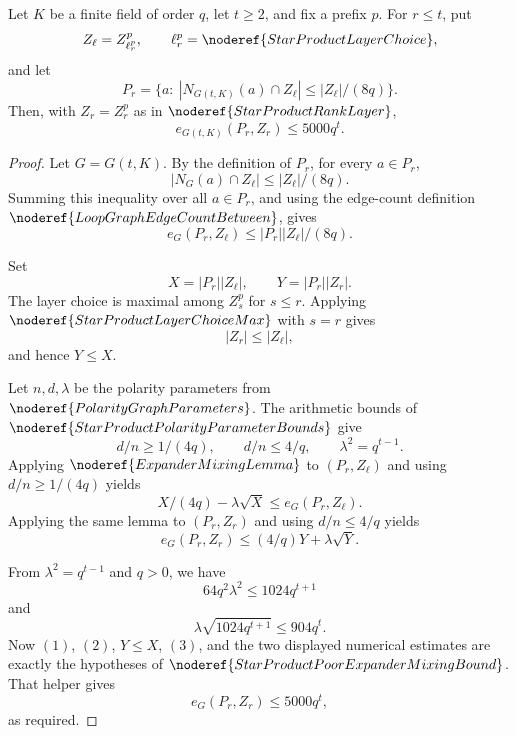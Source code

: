\begin{helper}
Let \(K\) be a finite field of order \(q\), let \(t\ge2\), and fix a
prefix \(p\).  For \(r\le t\), put
\[
  Z_\ell=Z^p_{\ell^p_r},
  \qquad \ell^p_r=\noderef{StarProductLayerChoice},
\]
and let
\[
  P_r=\{a:\ |N_{G(t,K)}(a)\cap Z_\ell|\le |Z_\ell|/(8q)\}.
\]
Then, with \(Z_r=Z^p_r\) as in \(\noderef{StarProductRankLayer}\),
\[
  e_{G(t,K)}(P_r,Z_r)\le 5000q^t .
\]
\end{helper}
\begin{proof}
Let \(G=G(t,K)\).  By the definition of \(P_r\), for every
\(a\in P_r\),
\[
  |N_G(a)\cap Z_\ell|\le |Z_\ell|/(8q).
\]
Summing this inequality over all \(a\in P_r\), and using the edge-count
definition \(\noderef{LoopGraphEdgeCountBetween}\), gives
\[
  e_G(P_r,Z_\ell)\le |P_r||Z_\ell|/(8q). \tag{1}
\]

Set
\[
  X=|P_r||Z_\ell|,\qquad Y=|P_r||Z_r|.
\]
The layer choice is maximal among \(Z^p_s\) for \(s\le r\).  Applying
\(\noderef{StarProductLayerChoiceMax}\) with \(s=r\) gives
\[
  |Z_r|\le |Z_\ell|,
\]
and hence \(Y\le X\).

Let \(n,d,\lambda\) be the polarity parameters from
\(\noderef{PolarityGraphParameters}\).  The arithmetic bounds of
\(\noderef{StarProductPolarityParameterBounds}\) give
\[
  d/n\ge 1/(4q),\qquad d/n\le 4/q,\qquad \lambda^2=q^{t-1}.
\]
Applying \(\noderef{ExpanderMixingLemma}\) to \((P_r,Z_\ell)\) and using
\(d/n\ge1/(4q)\) yields
\[
  X/(4q)-\lambda\sqrt X\le e_G(P_r,Z_\ell). \tag{2}
\]
Applying the same lemma to \((P_r,Z_r)\) and using \(d/n\le4/q\) yields
\[
  e_G(P_r,Z_r)\le (4/q)Y+\lambda\sqrt Y. \tag{3}
\]

From \(\lambda^2=q^{t-1}\) and \(q>0\), we have
\[
  64q^2\lambda^2\le1024q^{t+1}
\]
and
\[
  \lambda\sqrt{1024q^{t+1}}\le904q^t.
\]
Now \((1)\), \((2)\), \(Y\le X\), \((3)\), and the two displayed numerical
estimates are exactly the hypotheses of
\(\noderef{StarProductPoorExpanderMixingBound}\).  That helper gives
\[
  e_G(P_r,Z_r)\le5000q^t,
\]
as required.
\end{proof}
